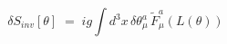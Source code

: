 \begin{equation}\label{eq:fvar1}
\delta S_{inv}[\theta] \;=\; i g \int d^3x \, \delta\theta_\mu^a \,
{\tilde F}_\mu^a (L(\theta))
\end{equation}

